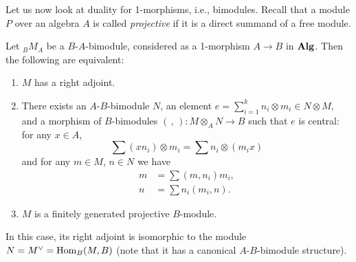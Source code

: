 Let us now look at duality for 1-morphisms, i.e., bimodules.
Recall that a module $P$ over an algebra $A$ is called
\emph{projective}
if it is a direct summand of a free module.

\begin{theorem}\label{t:alg-adjoint}
  Let ${}_BM_A$ be a $B$-$A$-bimodule, considered as a 1-morphism
  $A\to B$ in $\mathbf{Alg}$.
  Then the following are equivalent:
  \begin{enumerate}
    \item $M$ has a right adjoint.
    \item There exists an $A$-$B$-bimodule $N$, an element
      $e=\sum_{i=1}^k n_i\otimes m_i\in N\otimes M$,
      and a morphism of $B$-bimodules $(\, ,\,)\colon M\otimes_A N\to B$
      such that $e$ is central: for any $x\in A$,
      $$
        \sum (xn_i)\otimes m_i=\sum n_i\otimes (m_i x)
      $$
      and for any $m\in M$, $n\in N$ we have
      \begin{equation}\label{e:alg-adjoint-snake}
        \begin{aligned}
          m&=\sum (m, n_i) m_i,\\
          n&=\sum n_i (m_i, n).
        \end{aligned}
      \end{equation}
    \item $M$ is a finitely generated projective $B$-module.
  \end{enumerate}
  In this case, its right adjoint is isomorphic to the module
  $N=M^\vee = \operatorname{Hom}_B (M, B)$ \textup{(}note that it has a
  canonical $A$-$B$-bimodule structure\textup{)}.
\end{theorem}
